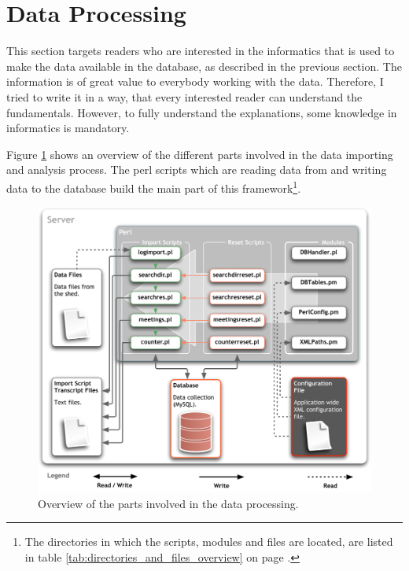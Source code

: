 \newpage
\section{Data Processing}
\label{sec:dataproc}

This section targets readers who are interested in the informatics that is used to make the data available in the database, as described in the previous section. The information is of great value to everybody working with the data. Therefore, I tried to write it in a way, that every interested reader can understand the fundamentals. However, to fully understand the explanations, some knowledge in informatics is mandatory.      

Figure \ref{fig:app_design_perl} shows an overview of the different parts involved in the data importing and analysis process. The \ac{perl} scripts which are reading data from and writing data to the database build the main part of this framework\footnote{The directories in which the scripts, modules and files are located, are listed in table \ref{tab:directories_and_files_overview} on page \pageref{tab:directories_and_files_overview}.}.

\begin{figure}[htpb]
\begin{center}
  \includegraphics[width=\textwidth]{assets/pdf/app_design_perl.pdf}
  \caption[Data processing overview]{Overview of the parts involved in the data processing.}
  \label{fig:app_design_perl}
\end{center}
\end{figure}

